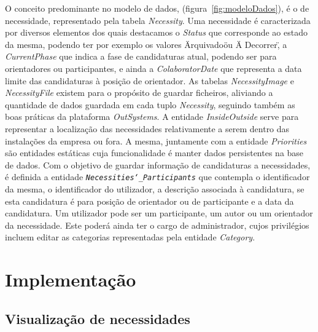 O conceito predominante no modelo de dados, (figura~\ref{fig:modeloDados}), é o de necessidade, representado pela tabela \textit{Necessity}. 
Uma necessidade é caracterizada por diversos elementos dos quais destacamos o \textit{Status} que corresponde ao estado da mesma, 
podendo ter por exemplo os valores \"Arquivado\" ou \"A Decorrer\", a \textit{CurrentPhase} que indica a fase de candidaturas atual, 
podendo ser para orientadores ou participantes, e ainda a \textit{ColaboratorDate} que representa a data limite das candidaturas 
à posição de orientador. 
As tabelas \textit{NecessityImage} e \textit{NecessityFile} existem para o propósito de guardar ficheiros, 
aliviando a quantidade de dados guardada em cada tuplo \textit{Necessity}, 
seguindo também as boas práticas da plataforma \textit{OutSystems}. 
A entidade \textit{InsideOutside} serve para representar a localização das necessidades relativamente a serem 
dentro das instalações da empresa ou fora. A mesma, juntamente com a entidade \textit{Priorities} 
são entidades estáticas cuja funcionalidade é manter dados persistentes na base de dados.
Com o objetivo de guardar informação de candidaturas a necessidades, é definida a entidade \texttt{\textit{Necessities\char`_Participants}} que 
contempla o identificador da mesma, o identificador do utilizador, a descrição associada à candidatura, 
se esta candidatura é para posição de orientador ou de participante e a data da candidatura. 
Um utilizador pode ser um participante, um autor ou um orientador da necessidade. 
Este poderá ainda ter o cargo de administrador, cujos privilégios incluem editar as categorias representadas pela 
entidade \textit{Category}.

\section{Implementação}\label{sec:implementação}

\subsection{Visualização de necessidades}\label{sec:necessities}

